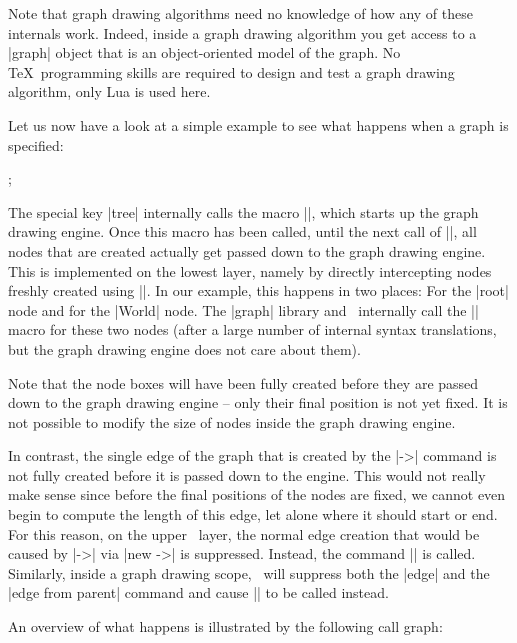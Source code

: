 Note that graph drawing algorithms need no knowledge of how any of
these internals work. Indeed, inside a graph drawing algorithm you get
access to a |graph| object that is an object-oriented model of the
graph. No \TeX\ programming skills are required to design and test a
graph drawing algorithm, only Lua is used here.

Let us now have a look at a simple example to see what happens when a
graph is specified:

\begin{codeexample}[]
\tikz[tree]
  ;
\end{codeexample}

The special key |tree| internally calls the macro |\pgfgdbeginscope|,
which starts up the graph drawing engine. Once this macro has been
called, until the next call of |\pgfgdendscope|, all nodes that are
created actually get passed down to the graph drawing engine. This is
implemented on the lowest layer, namely by directly intercepting
nodes freshly created using |\pgfnode|. In our example, this happens
in two places: For the |root| node and for the |World| node. The
|graph| library and \tikzname\ internally call the |\pgfnode| macro
for these two nodes (after a large number of internal syntax
translations, but the graph drawing engine does not care about them).

Note that the node boxes will have been fully created before they are
passed down to the graph drawing engine -- only their final position
is not yet fixed. It is not possible to modify the size of nodes
inside the graph drawing engine. 

In contrast, the single edge of the graph that is created by the |->|
command is not fully created before it is passed down to the
engine. This would not really make sense since before the final
positions of the nodes are fixed, we cannot even begin to compute the
length of this edge, let alone where it should start or end. For this
reason, on the upper \tikzname\ layer, the normal edge creation that
would be caused by |->| via |new ->| is suppressed. Instead, the
command |\pgfgdedge| is called. Similarly, inside a graph drawing
scope, \tikzname\ will suppress both the |edge| and the
|edge from parent| command and cause |\pgfgdedge| to be called
instead. 

An overview of what happens is illustrated by the following call graph:

